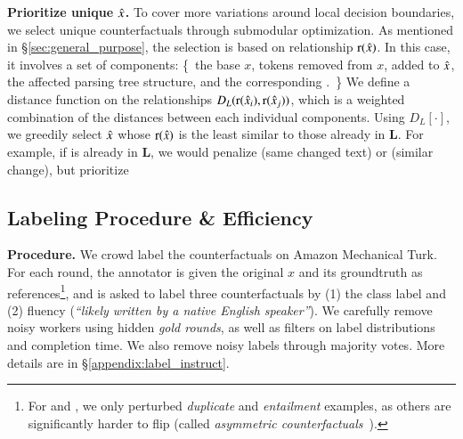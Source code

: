 \textbf{Prioritize unique $\hat{x}$.}
To cover more variations around local decision boundaries, we select unique counterfactuals through submodular optimization.
As mentioned in \S\ref{sec:general_purpose}, the selection is based on relationship $\operatorname*{r}(\hat{x})$.
In this case, it involves a set of components: \{\ the base $x$, tokens removed from $x$, added to $\hat{x}$, the affected parsing tree structure, and the corresponding \tagstr.\ \}
We define a distance function on the relationships $D_L(\operatorname*{r}(\hat{x}_i), \operatorname*{r}(\hat{x}_j))$, which is a weighted combination of the distances between each individual components.
Using $D_L[\boldsymbol{\cdot}]$, we greedily select $\hat{x}$ whose $\operatorname*{r}(\hat{x})$ is the least similar to those already in $\mathbf{L}$.
For example, if  is already in $\mathbf{L}$, we would penalize  (same changed text) or  (similar  change), but prioritize 






\subsection{Labeling Procedure \& Efficiency}
\label{subsec:label_efficiency}

\textbf{Procedure.}
We crowd label the counterfactuals on Amazon Mechanical Turk. 
For each round, the annotator is given the original $x$ and its groundtruth as references\footnote{For \qqp and \nli, we only perturbed \emph{duplicate} and \emph{entailment} examples, as others are significantly harder to flip (called \emph{asymmetric counterfactuals}~\cite{garg2019counterfactual}).}, and is asked to label three counterfactuals by (1) the class label and (2) fluency (\emph{``likely written by a native English speaker''}). 
We carefully remove noisy workers using hidden \emph{gold rounds}, as well as filters on label distributions and completion time.
We also remove noisy labels through majority votes.
More details are in \S\ref{appendix:label_instruct}. 


